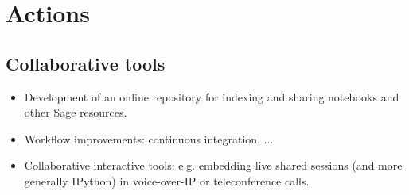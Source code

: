 \section{Actions}
\subsection{Collaborative tools}

\begin{itemize}
\item Development of an online repository for indexing and sharing
  notebooks and other Sage resources.
\item Workflow improvements: continuous integration, ...
\item Collaborative interactive tools: e.g. embedding live shared
  \sage sessions (and more generally IPython) in voice-over-IP or
  teleconference calls.


\end{itemize}


